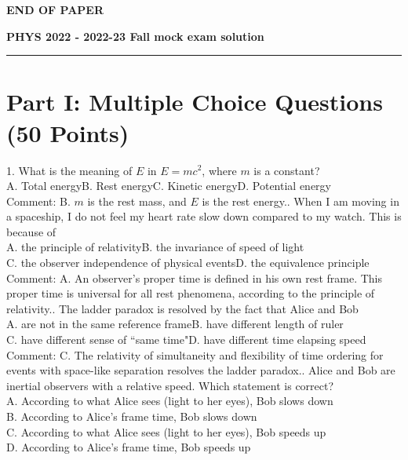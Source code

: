 \documentclass[12pt]{book} %
\numberwithin{equation}{chapter}
\def\mc{\hspace{0.5cm}}
\begin{document}
\vfill
\centerline{\bf END OF PAPER}

\newpage
{}
\begin{center}
\textbf{\LARGE PHYS 2022 - 2022-23 Fall mock exam solution}
\rule{16.5cm}{1pt}
\end{center}
\vspace{-0.5cm}
\section*{Part I: Multiple Choice Questions (50 Points)}
1. What is the meaning of $E$ in $E=mc^{2}$, where $m$ is a constant?\\
A. Total energy\mc B. Rest energy\mc C. Kinetic energy\mc D. Potential energy\\
Comment: B. $m$ is the rest mass, and $E$ is the rest energy.\bigskip{}. When I am moving in a spaceship, I do not feel my heart rate slow down compared to my watch. This is because of\\
A. the principle of relativity\mc B. the invariance of speed of light\\
C. the observer independence of physical events\mc D. the equivalence principle\\
Comment: A. An observer's proper time is defined in his own rest frame. This proper time is universal for all rest phenomena, according to the principle of relativity.\bigskip{}. The ladder paradox is resolved by the fact that Alice and Bob\\
A. are not in the same reference frame\mc B. have different length of ruler\\
C. have different sense of ``same time"\mc D. have different time elapsing speed\\
Comment: C. The relativity of simultaneity and flexibility of time ordering for events with space-like separation resolves the ladder paradox.\bigskip{}. Alice and Bob are inertial observers with a relative speed. Which statement is correct?\\
A. According to what Alice sees (light to her eyes), Bob slows down\\
B. According to Alice's frame time, Bob slows down\\
C. According to what Alice sees (light to her eyes), Bob speeds up\\
D. According to Alice's frame time, Bob speeds up\\
\end{document}
